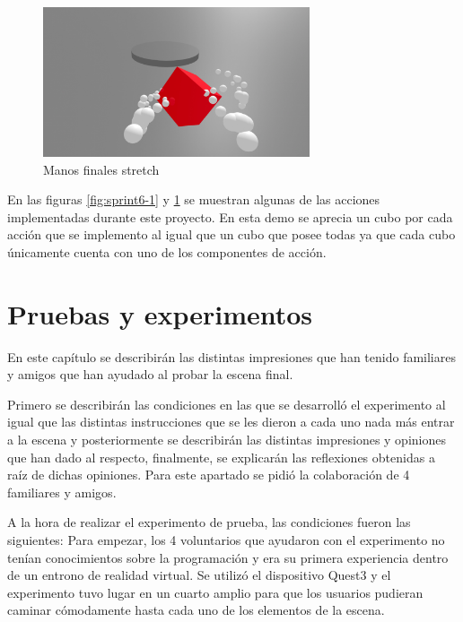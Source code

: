 \documentclass[a4paper, 12pt]{book}
\begin{document}
\begin{figure}[H] 
  \centering
  \includegraphics[width=0.7\textwidth]{img/stretch.jpg} 
  \caption{Manos finales stretch}
  \label{fig:sprint6-2}
\end{figure}

En las figuras \ref{fig:sprint6-1} y \ref{fig:sprint6-2} se muestran algunas de las acciones implementadas durante este proyecto. En esta demo se aprecia un cubo por cada acción que se implemento al igual que un cubo que posee todas ya que cada cubo únicamente cuenta con uno de los componentes de acción.


\cleardoublepage
\chapter{Pruebas y experimentos}
\label{chap:pruebas-experimentos}
En este capítulo se describirán las distintas impresiones que han tenido familiares y amigos que han ayudado al probar la escena final. 

Primero se describirán las condiciones en las que se desarrolló el experimento al igual que las distintas instrucciones que se les dieron a cada uno nada más entrar a la escena y posteriormente se describirán las distintas impresiones y opiniones que han dado al respecto, finalmente, se explicarán las reflexiones obtenidas a raíz de dichas opiniones.
Para este apartado se pidió la colaboración de 4 familiares y amigos.

A la hora de realizar el experimento de prueba, las condiciones fueron las siguientes: Para empezar, los 4 voluntarios que ayudaron con el experimento no tenían conocimientos sobre la programación y era su primera experiencia dentro de un entrono de realidad virtual. Se utilizó el dispositivo Quest3 y el experimento tuvo lugar en un cuarto amplio para que los usuarios pudieran caminar cómodamente hasta cada uno de los elementos de la escena.
\end{document}
